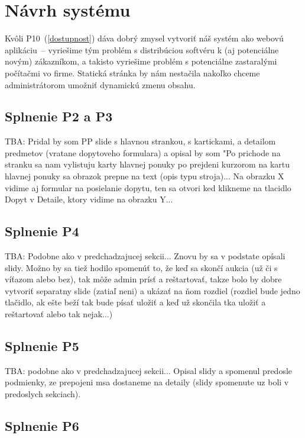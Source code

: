 \chapter{Návrh systému}

Kvôli P10~(\ref{dostupnost}) dáva dobrý zmysel vytvoriť náš systém ako webovú aplikáciu~-- vyriešime tým problém s distribúciou softvéru k (aj potenciálne novým) zákazníkom, a takisto vyriešime problém s potenciálne zastaralými počítačmi vo firme. Statická stránka by nám nestačila nakoľko chceme administrátorom umožniť dynamickú zmenu obsahu.

\section{Splnenie P2 a P3}

TBA: Pridal by som PP slide s hlavnou strankou, s kartickami, a detailom predmetov (vratane dopytoveho formulara) a opisal by som "Po prichode na stranku sa nam vylistuju karty hlavnej ponuky po prejdeni kurzorom na kartu hlavnej ponuky sa obrazok prepne na text (opis typu stroja)... Na obrazku X vidime aj formular na posielanie dopytu, ten sa otvori ked klikneme na tlacidlo Dopyt v Detaile, ktory vidime na obrazku Y...

\section{Splnenie P4}

TBA: Podobne ako v predchadzajucej sekcii... Znovu by sa v podstate opísali slidy. Možno by sa tiež hodilo spomenúť to, že keď sa skončí aukcia (už či s víťazom alebo bez), tak môže admin prísť a reštartovať, takze bolo by dobre vytvoriť separatny slide (zatiaľ neni) a ukázať na ňom rozdiel (rozdiel bude jedno tlačidlo, ak ešte beží tak bude písať uložiť a keď už skončila tka uložiť a reštartovať alebo tak nejak...)

\section{Splnenie P5}

TBA: podobne ako v predchadzajucej sekcii... Opisal slidy a spomenul predosle podmienky, ze prepojeni msa dostaneme na detaily (slidy spomenute uz boli v predoslych sekciach).

\section{Splnenie P6}

